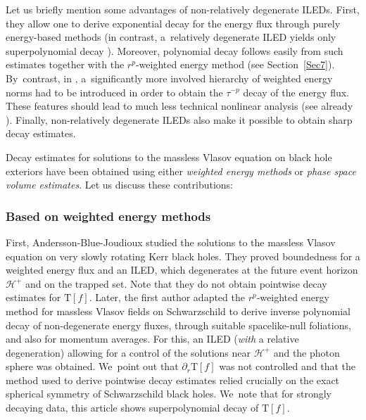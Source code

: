 \documentclass[JEP,XML,SOM,Unicode,published]{cedram}
\theoremstyle{plain}
\theoremstyle{definition}
\renewcommand\H{{\mathcal{H}^+}}
\begin{document}
Let us briefly mention some advantages of non-relatively degenerate ILEDs. First, they allow one to derive exponential decay for the energy flux through purely energy-based methods (in contrast, a~relatively degenerate ILED yields only superpolynomial decay \cite{DRSdS, L23}). Moreover, polynomial decay follows easily from such estimates together with the $r^p$-weighted energy method (see Section~\ref{Sec7}). By~contrast, in \cite{L23}, a~significantly more involved hierarchy of weighted energy norms had to be introduced in order to obtain the $\tau^{-p}$ decay of the energy flux. These features should lead to much less technical nonlinear analysis (see already \cite{Mavq}). Finally, non-relatively degenerate ILEDs also make it possible to obtain sharp decay estimates.


Decay estimates for solutions to the massless Vlasov equation on black hole exteriors have been obtained using either \emph{weighted energy methods} or \emph{phase space volume estimates}. Let us discuss these contributions:

\subsubsection{Based on weighted energy methods} First, Andersson-Blue-Joudioux \cite{ABJ} studied the solutions to the massless Vlasov equation on very slowly rotating Kerr black holes. They proved boundedness for a weighted energy flux and an ILED, which degenerates at the future event horizon $\H$ and on the trapped set. Note that they do not obtain pointwise decay estimates for $\mathrm{T}[f]$. Later, the first author \cite{L23} adapted the $r^p$-weighted energy method \cite{DR10} for massless Vlasov fields on Schwarzschild to derive inverse polynomial decay of non-degenerate energy fluxes, through suitable spacelike-null foliations, and also for momentum averages. For this, an ILED (\emph{with} a relative degeneration) allowing for a control of the solutions near $\H$ and the photon sphere was obtained. We~point out that $\partial_r \mathrm{T}[f]$ was not controlled and that the method used to derive pointwise decay estimates relied crucially on the exact spherical symmetry of Schwarzschild black holes. We~note that for strongly decaying data, this article shows superpolynomial decay of $\mathrm{T}[f]$.
\end{document}
